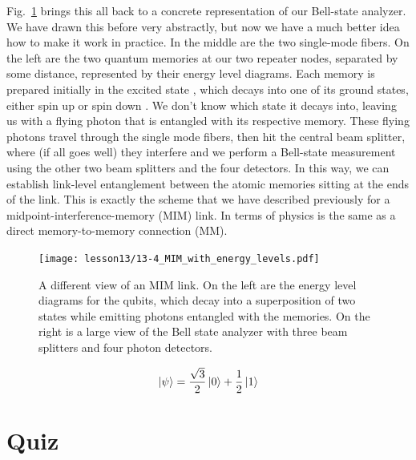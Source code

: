 Fig.~\ref{fig:13-MIM-energy} brings this all back to a concrete representation of our Bell-state analyzer. We have drawn this before very abstractly, but now we have a much better idea how to make it work in practice. In the middle are the two single-mode fibers. On the left are the two quantum memories at our two repeater nodes, separated by some distance, represented by their energy level diagrams. Each memory is prepared initially in the excited state , which decays into one of its ground states, either spin up \ket{\uparrow} or spin down \ket{\downarrow}. We don't know which state it decays into, leaving us with a flying photon that is entangled with its respective memory. These flying photons travel through the single mode fibers, then hit the central beam splitter, where (if all goes well) they interfere and we perform a Bell-state measurement using the other two beam splitters and the four detectors. In this way, we can establish link-level entanglement between the atomic memories sitting at the ends of the link. This is exactly the scheme that we have described previously for a midpoint-interference-memory (MIM) link. In terms of physics is the same as a direct memory-to-memory connection (MM).

\begin{figure}[t]
    \centering
    \texttt{[image: lesson13/13-4\_MIM\_with\_energy\_levels.pdf]}
    \caption[MIM with energy levels]{A different view of an MIM link. On the left are the energy level diagrams for the qubits, which decay into a superposition of two states while emitting photons entangled with the memories. On the right is a large view of the Bell state analyzer with three beam splitters and four photon detectors.}
    \label{fig:13-MIM-energy}
\end{figure}




\newpage
\begin{exercises}
\begin{equation*}
\left| \psi \right\rangle = \frac{\sqrt{3}}{2}\left| 0 \right\rangle + \frac{1}{2}\left| 1 \right\rangle
\end{equation*}


\end{exercises}

\newpage
\section*{Quiz}

